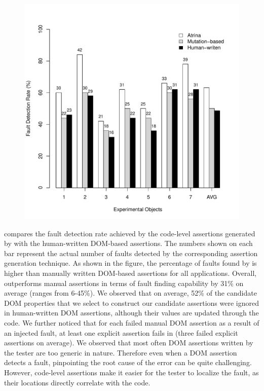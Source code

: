 \begin{figure}[!t]
  \centering
  \includegraphics[width=0.8\hsize]{r-scripts/barplot-faultDetectionRate}
  \vspace{-0.18in}   
  \vspace{-0.3in} 
  \label{Fig:barplot-faultDetectionRate}
\end{figure}
 compares the fault detection rate achieved by the code-level assertions generated by \tool with the human-written DOM-based assertions. The numbers shown on each bar represent the actual number of faults detected by the corresponding assertion generation technique. As shown in the figure, the percentage of faults found by \tool is higher than manually written DOM-based assertions for all applications. Overall, \tool outperforms manual assertions in terms of fault finding capability by 31\% on average (ranges from 6-45\%). We observed that on average, 52\% of the candidate DOM properties that we select to construct our candidate assertions were ignored in human-written DOM assertions, although their values are updated through the \javascript code.
We further noticed that for each failed manual DOM assertion as a result of an injected fault, at least one explicit assertion fails in \tool (three failed explicit assertions on average).
We observed that most often DOM assertions written by the tester are too generic in nature. Therefore even when a DOM assertion detects a \javascript fault, pinpointing the root cause of the error can be quite challenging. However, code-level assertions make it easier for the tester to localize the fault, as their locations directly correlate with the code.

